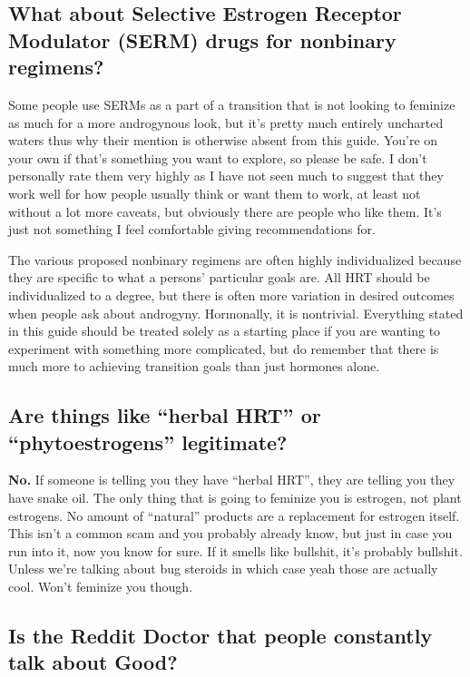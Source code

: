 \documentclass{article}
\begin{document}
\subsection{What about Selective Estrogen Receptor Modulator (SERM) drugs for nonbinary regimens?}

Some people use SERMs as a part of a transition that is not looking to feminize as much for a more androgynous look, but it’s pretty much entirely uncharted waters thus why their mention is otherwise absent from this guide. You’re on your own if that’s something you want to explore, so please be safe. I don’t personally rate them very highly as I have not seen much to suggest that they work well for how people usually think or want them to work, at least not without a lot more caveats, but obviously there are people who like them. It's just not something I feel comfortable giving recommendations for.

The various proposed nonbinary regimens are often highly individualized because they are specific to what a persons' particular goals are. All HRT should be individualized to a degree, but there is often more variation in desired outcomes when people ask about androgyny. Hormonally, it is nontrivial. Everything stated in this guide should be treated solely as a starting place if you are wanting to experiment with something more complicated, but do remember that there is much more to achieving transition goals than just hormones alone.

\subsection{Are things like “herbal HRT” or “phytoestrogens” legitimate?}

\textbf{No.} If someone is telling you they have “herbal HRT”, they are telling you they have snake oil. The only thing that is going to feminize you is estrogen, not plant estrogens. No amount of “natural” products are a replacement for estrogen itself. This isn’t a common scam and you probably already know, but just in case you run into it, now you know for sure. If it smells like bullshit, it’s probably bullshit. Unless we’re talking about bug steroids in which case yeah those are actually cool. Won’t feminize you though.

\subsection{Is the Reddit Doctor that people constantly talk about Good?}
\end{document}
